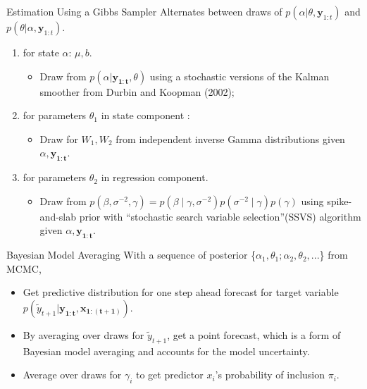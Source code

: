 \documentclass[14pt,xcolor=dvipsnames]{beamer}
\begin{document}
\begin{frame}{Estimation Using a Gibbs Sampler}
Alternates between draws of  $p(\alpha| \theta, \mathbf y_{1:t})$ and $p(\theta| \alpha,\mathbf y_{1:t})$.
\begin{enumerate}
\item  for state $\alpha$: $\mu, b$. 
 \begin{itemize}
 	\item    Draw from $p(\alpha | \mathbf{y_{1:t}}, \theta)$ using a stochastic versions of the Kalman smoother from Durbin and Koopman (2002);
 \end{itemize}
 
\item for parameters $\theta_1$ in state component :

 \begin{itemize}
 	\item   Draw for $W_1, W_2$ from independent inverse Gamma distributions given $\alpha, \mathbf{y_{1:t}}$. 
 \end{itemize}

\item for parameters $\theta_2$ in regression component. 
  \begin{itemize}
  	\item  Draw from $p(\beta, \sigma^{-2},\gamma) = p(\beta \mid \gamma, \sigma^{-2})p(\sigma^{-2} \mid \gamma )p(\gamma)$ using spike-and-slab prior with  “stochastic search variable selection”(SSVS) algorithm given $\alpha, \mathbf{y_{1:t}}$. 
  \end{itemize}

\end{enumerate}


\end{frame}






\begin{frame}{Bayesian Model Averaging}
With a sequence of posterior \{$\alpha_1, \theta_1; \alpha_2, \theta_2,...$\} from MCMC, 
\begin{itemize}
\item Get predictive distribution for one step ahead forecast for target variable
$p(\tilde{y}_{t+1} | \mathbf{y_{1:t}, \mathbf{x_{1:(t+1)}}})$.

\item By averaging over draws for $\tilde{y}_{t+1}$, get a point forecast, which is a form of Bayesian model averaging and accounts for the model uncertainty. \\

\item Average over draws for $\gamma_i$ to get predictor $x_i$'s probability of inclusion  $\pi_i$. 
\end{itemize}
\end{frame}
\end{document}

